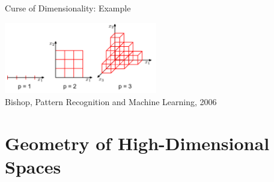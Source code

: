\begin{vbframe}{Curse of Dimensionality: Example}
\vspace*{-.2cm}

\begin{center}
\includegraphics[width = 0.5\textwidth]{figure_man/exponentialcubes.png}\\
\scriptsize{Bishop, Pattern Recognition and Machine Learning, 2006}
\end{center}

\end{vbframe}




\section{Geometry of High-Dimensional Spaces}

